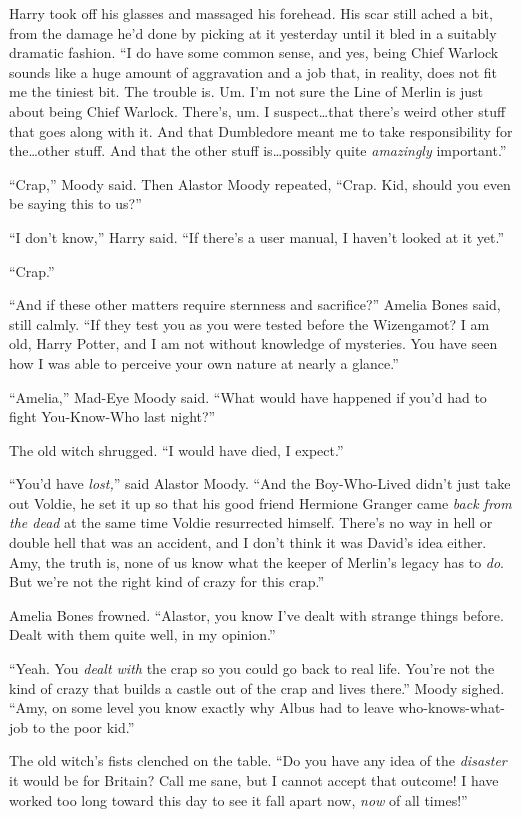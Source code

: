 Harry took off his glasses and massaged his forehead. His scar still ached a bit, from the damage he’d done by picking at it yesterday until it bled in a suitably dramatic fashion. “I do have some common sense, and yes, being Chief Warlock sounds like a huge amount of aggravation and a job that, in reality, does not fit me the tiniest bit. The trouble is. Um. I’m not sure the Line of Merlin is just about being Chief Warlock. There’s, um. I suspect…that there’s weird other stuff that goes along with it. And that Dumbledore meant me to take responsibility for the…other stuff. And that the other stuff is…possibly quite \emph{amazingly} important.”

“Crap,” Moody said. Then Alastor Moody repeated, “Crap. Kid, should you even be saying this to us?”

“I don’t know,” Harry said. “If there’s a user manual, I haven’t looked at it yet.”

“Crap.”

“And if these other matters require sternness and sacrifice?” Amelia Bones said, still calmly. “If they test you as you were tested before the Wizengamot? I am old, Harry Potter, and I am not without knowledge of mysteries. You have seen how I was able to perceive your own nature at nearly a glance.”

“Amelia,” Mad-Eye Moody said. “What would have happened if you’d had to fight You-Know-Who last night?”

The old witch shrugged. “I would have died, I expect.”

“You’d have \emph{lost,}” said Alastor Moody. “And the Boy-Who-Lived didn’t just take out Voldie, he set it up so that his good friend Hermione Granger came \emph{back from the dead} at the same time Voldie resurrected himself. There’s no way in hell or double hell that was an accident, and I don’t think it was David’s idea either. Amy, the truth is, none of us know what the keeper of Merlin’s legacy has to \emph{do}. But we’re not the right kind of crazy for this crap.”

Amelia Bones frowned. “Alastor, you know I’ve dealt with strange things before. Dealt with them quite well, in my opinion.”

“Yeah. You \emph{dealt with} the crap so you could go back to real life. You’re not the kind of crazy that builds a castle out of the crap and lives there.” Moody sighed. “Amy, on some level you know exactly why Albus had to leave who-knows-what-job to the poor kid.”

The old witch’s fists clenched on the table. “Do you have any idea of the \emph{disaster} it would be for Britain? Call me sane, but I cannot accept that outcome! I have worked too long toward this day to see it fall apart now, \emph{now} of all times!”

